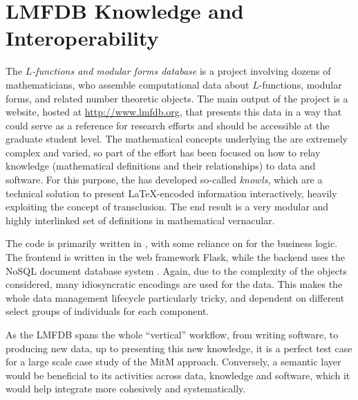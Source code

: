 \section{LMFDB Knowledge and Interoperability}\label{sec:lmfdb}
The \emph{$L$-functions and modular forms database} is a project involving dozens of
mathematicians, who assemble computational data about $L$-functions, modular forms, and
related number theoretic objects. The main output of the project is a website, hosted at
\url{http://www.lmfdb.org}, that presents this data in a way that could serve as a
reference for research efforts and should be accessible at the graduate student level.
The mathematical concepts underlying the \LMFDB are extremely complex and varied, so part
of the effort has been focused on how to relay knowledge (mathematical definitions and their
relationships) to data and software. For this purpose, the \LMFDB has developed so-called
\emph{knowls}, which are a technical solution to present \LaTeX-encoded information
interactively, heavily exploiting the concept of transclusion. The end result is a
very modular and highly interlinked set of definitions in mathematical vernacular.

The \LMFDB code is primarily written in \Python, with some reliance on \Sage for
the business logic. The frontend is written in the web framework Flask, while the backend
uses the NoSQL document database system \Mongo \cite{lmfdb-repo}. Again, due to the
complexity of the objects considered, many idiosyncratic encodings are used for the
data. This makes the whole data management lifecycle particularly tricky, and dependent on
different select groups of individuals for each component.

As the LMFDB spans the whole ``vertical'' workflow, from writing software, to producing new
data, up to presenting this new knowledge, it is a perfect test case for a large scale
case study of the MitM approach. Conversely, a semantic layer would be beneficial to its
activities across data, knowledge and software, which it would help integrate more
cohesively and systematically.


